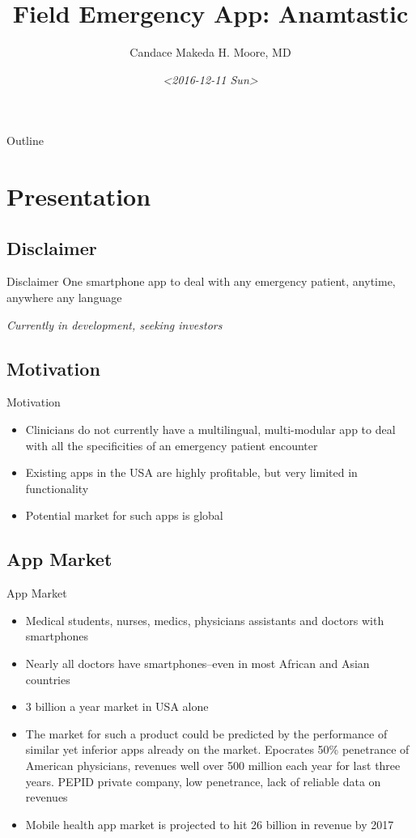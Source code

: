 \documentclass[presentation]{beamer}
\author{Candace Makeda H. Moore, MD}
\date{\textit{<2016-12-11 Sun>}}
\title{Field Emergency App: Anamtastic}
\begin{document}
\maketitle
\begin{frame}{Outline}
\tableofcontents
\end{frame}


\section{Presentation}
\label{sec-1}
\subsection{Disclaimer}
\label{sec-1-1}
\begin{frame}[label=sec-1-1-1]{Disclaimer}
One smartphone app to deal with any emergency patient, anytime,
anywhere any language

\emph{Currently in development, seeking investors}
\end{frame}

\subsection{Motivation}
\label{sec-1-2}
\begin{frame}[label=sec-1-2-1]{Motivation}
\begin{itemize}
\item Clinicians do not currently have a multilingual, multi-modular
app to deal with all the specificities of an emergency patient
encounter
\item Existing apps in the USA are highly profitable, but very limited in
functionality
\item Potential market for such apps is global
\end{itemize}
\end{frame}

\subsection{App Market}
\label{sec-1-3}
\begin{frame}[label=sec-1-3-1]{App Market}
\begin{itemize}
\item Medical students, nurses, medics, physicians assistants and doctors
with smartphones
\item Nearly all doctors have smartphones--even in most African and Asian
countries
\item 3 billion a year market in USA alone
\item The market for such a product could be predicted by the performance
of similar yet inferior apps already on the market.  \alert{Epocrates} 50\%
penetrance of American physicians, revenues well over 500 million
each year for last three years.  \alert{PEPID} private company, low
penetrance, lack of reliable data on revenues
\item Mobile health app market is projected to hit 26 billion in revenue
by 2017
\end{itemize}
\end{frame}
\end{document}
